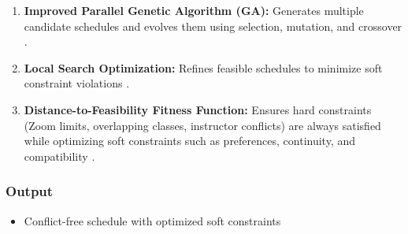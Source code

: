 \begin{enumerate}
    \item \textbf{Improved Parallel Genetic Algorithm (GA):}  
    Generates multiple candidate schedules and evolves them using selection, mutation, and crossover \cite{Sahargahi2021}.

    \item \textbf{Local Search Optimization:}  
    Refines feasible schedules to minimize soft constraint violations \cite{Sahargahi2021}.

    \item \textbf{Distance-to-Feasibility Fitness Function:}  
    Ensures hard constraints (Zoom limits, overlapping classes, instructor conflicts) are always satisfied while optimizing soft constraints such as preferences, continuity, and compatibility \cite{Sahargahi2021}.
\end{enumerate}

\subsubsection*{Output}
\begin{itemize}
    \item Conflict-free schedule with optimized soft constraints
\end{itemize}






